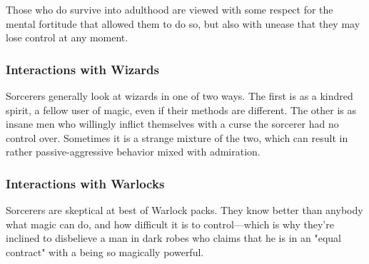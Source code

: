 \begin{multicols}{2}
Those who do survive into adulthood are viewed with some respect for the mental fortitude that allowed them to do so, but also with unease that they may lose control at any moment.

\subsubsection{Interactions with Wizards}
Sorcerers generally look at wizards in one of two ways.
The first is as a kindred spirit, a fellow user of magic, even if their methods are different.
The other is as insane men who willingly inflict themselves with a curse the sorcerer had no control over.
Sometimes it is a strange mixture of the two, which can result in rather passive-aggressive behavior mixed with admiration.

\subsubsection{Interactions with Warlocks}
Sorcerers are skeptical at best of Warlock packs.
They know better than anybody what magic can do, and how difficult it is to control---which is why they're inclined to disbelieve a man in dark robes who claims that he is in an "equal contract" with a being so magically powerful.


\end{multicols}